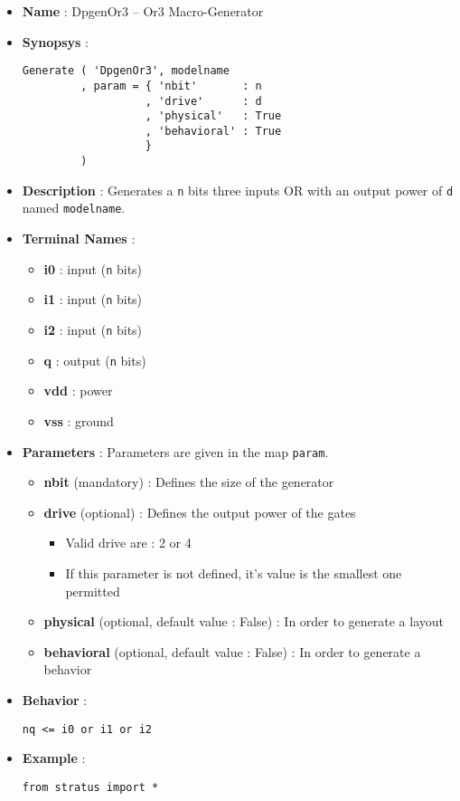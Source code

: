 \begin{itemize}
    \item \textbf{Name} : DpgenOr3 -- Or3 Macro-Generator
    \item \textbf{Synopsys} :
\begin{verbatim}
Generate ( 'DpgenOr3', modelname
         , param = { 'nbit'       : n
                   , 'drive'      : d
                   , 'physical'   : True
                   , 'behavioral' : True                   
                   }
         )
\end{verbatim}
    \item \textbf{Description} : Generates a \verb-n- bits three inputs OR with an output power of \verb-d- named \verb-modelname-.
    \item \textbf{Terminal Names} :
    \begin{itemize}
        \item \textbf{i0} : input (\verb-n- bits)
        \item \textbf{i1} : input (\verb-n- bits)
        \item \textbf{i2} : input (\verb-n- bits)
        \item \textbf{q} : output (\verb-n- bits)
        \item \textbf{vdd} : power
        \item \textbf{vss} : ground
    \end{itemize}
    \item \textbf{Parameters} : Parameters are given in the map \verb-param-.
    \begin{itemize}
        \item \textbf{nbit} (mandatory) : Defines the size of the generator
        \item \textbf{drive} (optional) : Defines the output power of the gates
        \begin{itemize}
            \item Valid drive are : 2 or 4
            \item If this parameter is not defined, it's value is the smallest one permitted
        \end{itemize}
        \item \textbf{physical} (optional, default value : False) : In order to generate a layout
        \item \textbf{behavioral} (optional, default value : False) : In order to generate a behavior        
    \end{itemize}
    \item \textbf{Behavior} :
\begin{verbatim}
nq <= i0 or i1 or i2
\end{verbatim}
    \item \textbf{Example} :
\begin{verbatim}
from stratus import *


\end{verbatim}
\end{itemize}
